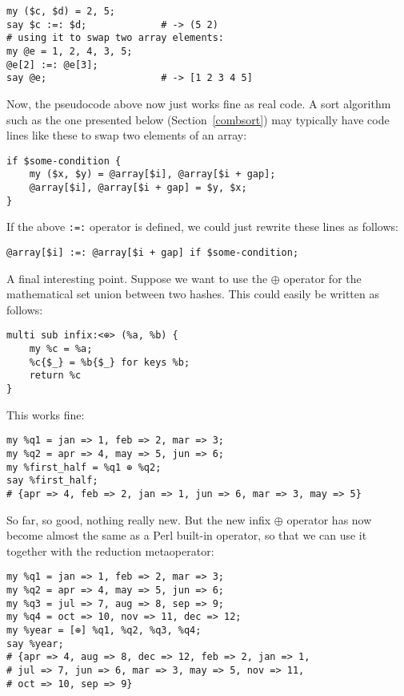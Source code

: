 \begin{verbatim}
my ($c, $d) = 2, 5;
say $c :=: $d;             # -> (5 2)
# using it to swap two array elements:
my @e = 1, 2, 4, 3, 5;
@e[2] :=: @e[3];
say @e;                    # -> [1 2 3 4 5]
\end{verbatim}

Now, the pseudocode above now just works fine as real code. 
A sort algorithm such as the one presented below 
(Section~\ref{combsort}) may typically have code lines 
like these to swap two elements of an array:

\begin{verbatim}
if $some-condition {
    my ($x, $y) = @array[$i], @array[$i + gap];
    @array[$i], @array[$i + gap] = $y, $x;
}
\end{verbatim}

If the above  \verb':=:' operator is defined, we 
could just rewrite these lines as follows:

\begin{verbatim}
@array[$i] :=: @array[$i + gap] if $some-condition;
\end{verbatim}

A final interesting point. Suppose we want to use 
the $\oplus$ operator for the mathematical set 
union between two hashes. This could easily be 
written as follows:

\begin{verbatim}
multi sub infix:<⊕> (%a, %b) {
    my %c = %a;
    %c{$_} = %b{$_} for keys %b;
    return %c
}
\end{verbatim}

This works fine:

\begin{verbatim}
my %q1 = jan => 1, feb => 2, mar => 3;
my %q2 = apr => 4, may => 5, jun => 6;
my %first_half = %q1 ⊕ %q2;
say %first_half;
# {apr => 4, feb => 2, jan => 1, jun => 6, mar => 3, may => 5}
\end{verbatim}

So far, so good, nothing really new. But the new 
infix $\oplus$ operator has now become almost the same 
as a Perl built-in operator, so that we can use it 
together with the reduction metaoperator:

\begin{verbatim}
my %q1 = jan => 1, feb => 2, mar => 3;
my %q2 = apr => 4, may => 5, jun => 6;
my %q3 = jul => 7, aug => 8, sep => 9;
my %q4 = oct => 10, nov => 11, dec => 12;
my %year = [⊕] %q1, %q2, %q3, %q4;
say %year;
# {apr => 4, aug => 8, dec => 12, feb => 2, jan => 1, 
# jul => 7, jun => 6, mar => 3, may => 5, nov => 11, 
# oct => 10, sep => 9}
\end{verbatim}


